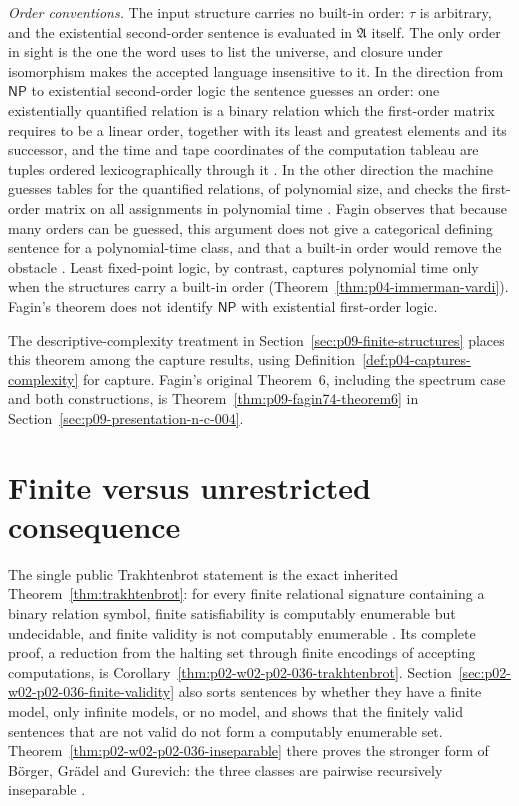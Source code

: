 \emph{Order conventions.}  The input structure carries no built-in order:
\(\tau\) is arbitrary, and the existential second-order sentence is evaluated
in \(\mathfrak A\) itself.  The only order in sight is the one the word uses to
list the universe, and closure under isomorphism makes the accepted language
insensitive to it.  In the direction from \(\mathsf{NP}\) to existential
second-order logic the sentence guesses an order: one existentially
quantified relation is a binary relation which the first-order matrix
requires to be a linear order, together with its least and greatest elements
and its successor, and the time and tape coordinates of the computation
tableau are tuples ordered lexicographically through it
\cite[pp.~54--55]{Fagin1974}.  In the other direction the machine guesses
tables for the quantified relations, of polynomial size, and checks the
first-order matrix on all assignments in polynomial time
\cite[pp.~53--54]{Fagin1974}.  Fagin observes that because many orders can
be guessed, this argument does not give a categorical defining sentence for
a polynomial-time class, and that a built-in order would remove the obstacle
\cite[p.~60]{Fagin1974}.  Least fixed-point logic, by contrast, captures
polynomial time only when the structures carry a built-in order
(Theorem~\ref{thm:p04-immerman-vardi}).  Fagin's theorem does not identify
\(\mathsf{NP}\) with existential first-order logic.

The descriptive-complexity treatment in Section~\ref{sec:p09-finite-structures}
places this theorem among the capture results, using
Definition~\ref{def:p04-captures-complexity} for capture.  Fagin's original
Theorem~6, including the spectrum case and both constructions, is
Theorem~\ref{thm:p09-fagin74-theorem6} in
Section~\ref{sec:p09-presentation-n-c-004}.

\section{Finite versus unrestricted consequence}
\label{sec:p03-finite-unrestricted}

The single public Trakhtenbrot statement is the exact inherited
Theorem~\ref{thm:trakhtenbrot}: for every finite relational signature
containing a binary relation symbol, finite satisfiability is computably
enumerable but undecidable, and finite validity is not computably enumerable
\cite{Trakhtenbrot1950}.  Its complete proof, a reduction from the halting set
through finite encodings of accepting computations, is
Corollary~\ref{thm:p02-w02-p02-036-trakhtenbrot}.
Section~\ref{sec:p02-w02-p02-036-finite-validity} also sorts sentences by
whether they have a finite model, only infinite models, or no model, and
shows that the finitely valid sentences that are not valid do not form a
computably enumerable set.  Theorem~\ref{thm:p02-w02-p02-036-inseparable}
there proves the stronger form of Börger, Grädel and Gurevich: the three
classes are pairwise recursively inseparable
\cite[Sect.~2.1.2, Thm.~2.1.30]{BorgerGradelGurevich1997}.

